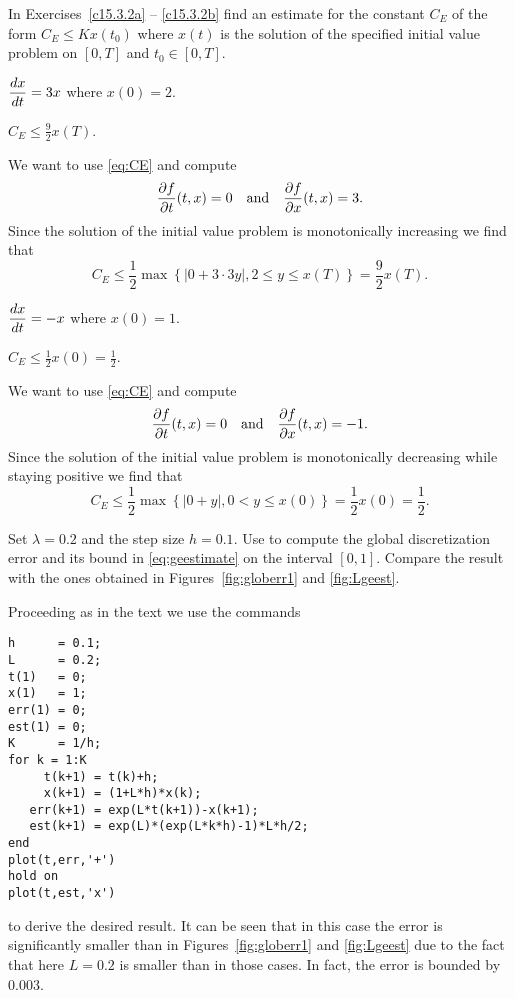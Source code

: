 \documentclass{ximera}
\begin{document}
\noindent In Exercises~\ref{c15.3.2a} -- \ref{c15.3.2b} find an estimate
for the constant $C_E$ of the form $C_E \le Kx(t_0)$ where $x(t)$ is the
solution of the specified initial value problem on $[0,T]$ and $t_0\in[0,T]$.
\begin{exercise} \label{c15.3.2a}
$\displaystyle\frac{dx}{dt} = 3 x$ where $x(0) = 2$.

\begin{solution}
\ans $C_E \le \frac{9}{2}x(T)$.

\soln We want to use \eqref{eq:CE} and compute
\[
\frac{\partial f}{\partial t}(t,x)=0\quad\mbox{and}\quad
\frac{\partial f}{\partial x}(t,x)=3.
\]
Since the solution of the initial value problem is monotonically
increasing we find that
\[
C_E\le \frac{1}{2}\max\left\{ \left\vert 0+3\cdot 3y\right\vert,
2\le y\le x(T) \right\} = \frac{9}{2}x(T).
\]

\end{solution}
\end{exercise}
\begin{exercise} \label{c15.3.2b}
$\displaystyle\frac{dx}{dt} = -x$ where $x(0) = 1$.

\begin{solution}
\ans $C_E \le \frac{1}{2}x(0)=\frac{1}{2}$.

\soln We want to use \eqref{eq:CE} and compute
\[
\frac{\partial f}{\partial t}(t,x)=0\quad\mbox{and}\quad
\frac{\partial f}{\partial x}(t,x)=-1.
\]
Since the solution of the initial value problem is monotonically
decreasing while staying positive we find that
\[
C_E\le \frac{1}{2}\max\left\{ \left\vert 0+y\right\vert,
0<y\le x(0) \right\} = \frac{1}{2}x(0)=\frac{1}{2}.
\]


\end{solution}
\end{exercise}


\CEXER

\begin{exercise} \label{c15.3.3}
Set $\lambda=0.2$ and the step size $h=0.1$.  Use \Matlab to compute 
the global discretization error and its bound in \eqref{eq:geestimate}
on the interval $[0,1]$.  Compare the result with the ones obtained 
in Figures~\ref{fig:globerr1} and \ref{fig:Lgeest}.

\begin{solution}

Proceeding as in the text we use the \Matlab commands
\begin{verbatim}
h      = 0.1;
L      = 0.2;
t(1)   = 0;
x(1)   = 1;
err(1) = 0;
est(1) = 0;
K      = 1/h;
for k = 1:K
     t(k+1) = t(k)+h;
     x(k+1) = (1+L*h)*x(k);
   err(k+1) = exp(L*t(k+1))-x(k+1);
   est(k+1) = exp(L)*(exp(L*k*h)-1)*L*h/2;
end
plot(t,err,'+')
hold on
plot(t,est,'x')
\end{verbatim}
to derive the desired result.  It can be seen that in this case
the error is significantly smaller than in Figures~\ref{fig:globerr1}
and \ref{fig:Lgeest} due to the fact that here $L=0.2$ is smaller
than in those cases.  In fact, the error is bounded by $0.003$.





\end{solution}
\end{exercise}
\end{document}
